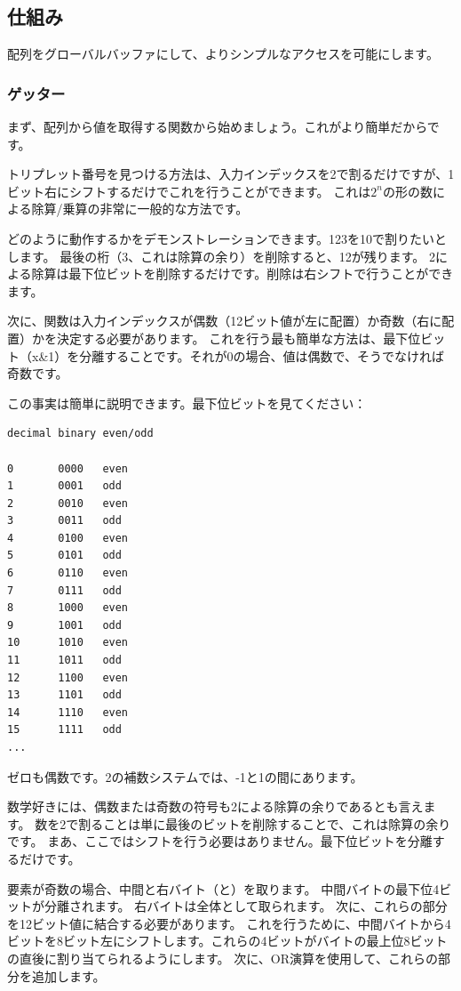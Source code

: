 

\subsection{仕組み}

配列をグローバルバッファにして、よりシンプルなアクセスを可能にします。

\subsubsection{ゲッター}

まず、配列から値を取得する関数から始めましょう。これがより簡単だからです。

トリプレット番号を見つける方法は、入力インデックスを2で割るだけですが、1ビット右にシフトするだけでこれを行うことができます。
これは$2^n$の形の数による除算/乗算の非常に一般的な方法です。

どのように動作するかをデモンストレーションできます。123を10で割りたいとします。
最後の桁（3、これは除算の余り）を削除すると、12が残ります。
2による除算は最下位ビットを削除するだけです。削除は右シフトで行うことができます。

次に、関数は入力インデックスが偶数（12ビット値が左に配置）か奇数（右に配置）かを決定する必要があります。
これを行う最も簡単な方法は、最下位ビット（x\&1）を分離することです。それが0の場合、値は偶数で、そうでなければ奇数です。

この事実は簡単に説明できます。最下位ビットを見てください：

\begin{lstlisting}
decimal binary even/odd

0       0000   even
1       0001   odd
2       0010   even
3       0011   odd
4       0100   even
5       0101   odd
6       0110   even
7       0111   odd
8       1000   even
9       1001   odd
10      1010   even
11      1011   odd
12      1100   even
13      1101   odd
14      1110   even
15      1111   odd
...
\end{lstlisting}

ゼロも偶数です。2の補数システムでは、-1と1の間にあります。

数学好きには、偶数または奇数の符号も2による除算の余りであるとも言えます。
数を2で割ることは単に最後のビットを削除することで、これは除算の余りです。
まあ、ここではシフトを行う必要はありません。最下位ビットを分離するだけです。

要素が奇数の場合、中間と右バイト（と）を取ります。
中間バイトの最下位4ビットが分離されます。
右バイトは全体として取られます。
次に、これらの部分を12ビット値に結合する必要があります。
これを行うために、中間バイトから4ビットを8ビット左にシフトします。これらの4ビットがバイトの最上位8ビットの直後に割り当てられるようにします。
次に、OR演算を使用して、これらの部分を追加します。

